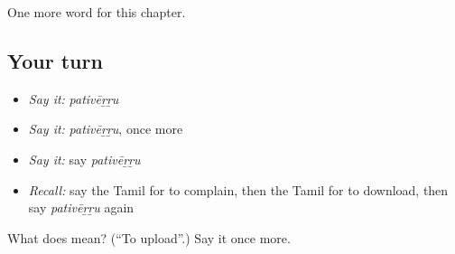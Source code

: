 \begin{grammarlens}[title={What you've built}]
One more word for this chapter.
\end{grammarlens}

\subsection*{Your turn}
\begin{itemize}
\raggedright
  \item \emph{Say it:} \emph{pativēṟṟu}
  \item \emph{Say it:} \emph{pativēṟṟu}, once more
  \item \emph{Say it:} say \emph{pativēṟṟu}
  \item \emph{Recall:} say the Tamil for to complain, then the Tamil for to download, then say \emph{pativēṟṟu} again
\end{itemize}

\begin{tcolorbox}[breakable,colback=teal!4,colframe=teal!35!black,title={Before you move on}]
What does  mean? (\textquotedblleft{}To upload\textquotedblright{}.) Say it once more.
\end{tcolorbox}

